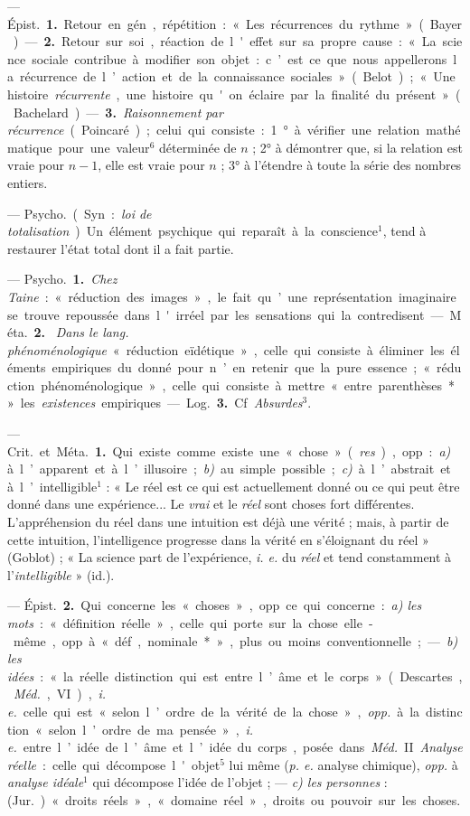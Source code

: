 \begin{itemize}[leftmargin=1cm, label=, itemsep=1pt]
 — \si{Épist.} {\bf 1.} Retour en gén., répétition : « Les
récurrences du rythme » (Bayer). — {\bf 2.} Retour sur soi, réaction de
l'effet sur sa propre cause : « La science sociale contribue à modifier son
objet : c’est ce que nous appellerons la récurrence de l’action et de la
connaissance sociales » (Belot) ; « Une histoire {\it récurrente}, une
histoire qu'on éclaire par la finalité du présent » (Bachelard). — {\bf 3.}
{\it Raisonnement par récurrence} (Poincaré) ; celui qui consiste : 1° à
vérifier une relation mathématique pour une valeur$^6$ déterminée de $n$ ; 2°
à démontrer que, si la relation est vraie pour $n - 1$, elle est vraie pour
$n$ ; 3° à l’étendre à toute la série des nombres entiers.

 — \si{Psycho.} (Syn. : {\it loi de
totalisation}). Un élément psychique qui reparaît à la conscience$^1$, tend à
restaurer l’état total dont il a fait partie.

 — \si{Psycho.} {\bf 1.} {\it Chez Taine} : « réduction des
images », le fait qu’une représentation imaginaire se trouve repoussée dans
l'irréel par les sensations qui la contredisent. — \si{Méta.} {\bf 2.} {\it
Dans le lang. phénoménologique} « réduction eïdétique », celle qui consiste à
éliminer les éléments
empiriques du donné pour n’en retenir que la pure essence; « réduction
phénoménologique », celle qui consiste à mettre « entre parenthèses* » les
{\it existences} empiriques. — \si{Log.} {\bf 3.} Cf. {\it Absurdes}$^3$.

 — \si{Crit.} et \si{Méta.} {\bf 1.} Qui existe comme existe une «
chose » ({\it res}), opp. : {\it a)} à l’apparent et à l’illusoire; {\it b)}
au simple possible ; {\it c)} à l’abstrait et à l’intelligible$^1$ : « Le
réel est ce qui est actuellement donné ou ce qui peut être donné dans une
expérience... Le {\it vrai} et le {\it réel} sont choses fort différentes.
L’appréhension du réel dans une intuition est déjà une vérité ; mais, à
partir de cette intuition, l'intelligence progresse dans la vérité en
s’éloignant du réel » (Goblot) ; « La science part de l’expérience,
{\it i. e.} du {\it réel} et tend constamment à l'{\it intelligible} » (id.).

— \si{Épist.} {\bf 2.} Qui concerne les « choses », opp. ce qui concerne :
{\it a) les mots} : « définition réelle », celle qui porte sur la chose
elle-même, opp. à « déf, nominale* », plus ou moins conventionnelle ; —
{\it b) les idées} : « la réelle distinction qui est entre l’âme et le corps
» (Descartes, {\it Méd.}, VI), {\it i. e.} celle qui est « selon l’ordre de
la vérité de la chose », {\it opp.} à la distinction « selon l’ordre de ma
pensée », {\it i. e.} entre l’idée de l’âme et l’idée du corps, posée dans
{\it Méd.} II. {\it Analyse réelle} : celle qui décompose l'objet$^5$ lui
même ({\it p. e.} analyse chimique), {\it opp.} à {\it analyse idéale}$^1$
qui décompose l'idée de l’objet ; — {\it c) les personnes} : (\si{Jur.}) «
droits réels », « domaine réel », droits ou pouvoir sur les choses.


\end{itemize}

